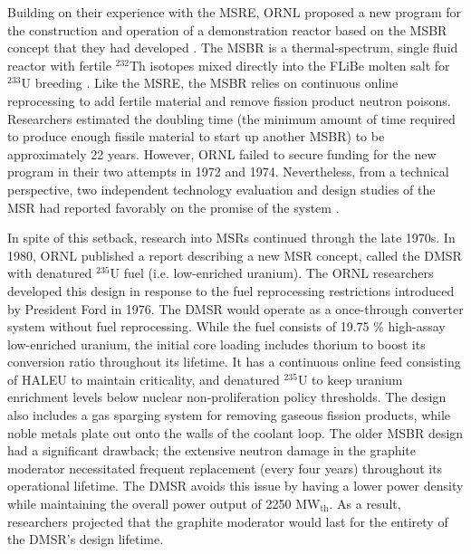 Building on their experience with the \gls{MSRE}, \gls{ORNL} proposed a
new program for the construction and operation of a demonstration reactor
based on the \gls{MSBR} concept that they had
developed \cite{macpherson_molten_1985}. The \gls{MSBR} is a thermal-spectrum,
single fluid reactor with fertile $^{232}$Th isotopes mixed directly into the
FLiBe molten salt for $^{233}$U breeding \cite{gehin_liquid_2016}. Like the
\gls{MSRE}, the \gls{MSBR} relies on continuous online reprocessing to add
fertile material and remove fission product neutron poisons. Researchers
estimated the doubling time (the minimum amount of time required to produce
enough fissile material to start up another \gls{MSBR}) to be
approximately 22 years. However, \gls{ORNL} failed to secure funding for the
new program in their two attempts in 1972 and 1974. Nevertheless, from a
technical perspective, two independent
technology evaluation and design studies of the \gls{MSR} had reported
favorably on the promise of the system \cite{macpherson_molten_1985}.

In spite of this setback, research into \glspl{MSR} continued through the late
1970s. In 1980, \gls{ORNL} published a report describing a new \gls{MSR}
concept, called the \gls{DMSR} \cite{gehin_liquid_2016} with denatured
$^{235}$U fuel (i.e. low-enriched uranium). The \gls{ORNL} researchers
developed this design in response to the fuel reprocessing restrictions
introduced by President Ford in 1976. The \gls{DMSR} would operate as a
once-through
converter system without fuel reprocessing. While the fuel consists of 19.75
\% high-assay low-enriched uranium, the initial core loading includes thorium
to boost its conversion ratio throughout its lifetime. It has a continuous
online feed consisting of \gls{HALEU} to maintain criticality, and denatured
$^{235}$U to keep uranium enrichment levels below nuclear non-proliferation
policy thresholds. The design also includes a gas sparging system for removing
gaseous fission products, while noble metals plate out onto the walls of
the coolant loop. The older \gls{MSBR} design had a significant drawback; the
extensive neutron damage in the graphite moderator necessitated frequent
replacement (every four years) throughout its operational lifetime. The
\gls{DMSR} avoids this issue by having a lower power density while maintaining
the overall power output of 2250 MW$_{\text{th}}$. As a result, researchers
projected that the graphite moderator would last for the entirety of the
\gls{DMSR}'s design lifetime.

